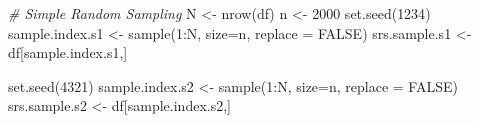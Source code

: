 \documentclass[11pt,]{article}
\newenvironment{Shaded}{\begin{snugshade}}{\end{snugshade}}
\newcommand{\AttributeTok}[1]{\textcolor[rgb]{0.77,0.63,0.00}{#1}}
\newcommand{\CommentTok}[1]{\textcolor[rgb]{0.56,0.35,0.01}{\textit{#1}}}
\newcommand{\ConstantTok}[1]{\textcolor[rgb]{0.00,0.00,0.00}{#1}}
\newcommand{\DecValTok}[1]{\textcolor[rgb]{0.00,0.00,0.81}{#1}}
\newcommand{\FunctionTok}[1]{\textcolor[rgb]{0.00,0.00,0.00}{#1}}
\newcommand{\NormalTok}[1]{#1}
\newcommand{\OtherTok}[1]{\textcolor[rgb]{0.56,0.35,0.01}{#1}}
\newcommand{\SpecialCharTok}[1]{\textcolor[rgb]{0.00,0.00,0.00}{#1}}
\begin{document}
\begin{Shaded}
\begin{Highlighting}[]
\CommentTok{\# Simple Random Sampling}
\NormalTok{N }\OtherTok{\textless{}{-}} \FunctionTok{nrow}\NormalTok{(df)}
\NormalTok{n }\OtherTok{\textless{}{-}} \DecValTok{2000}
\FunctionTok{set.seed}\NormalTok{(}\DecValTok{1234}\NormalTok{)}
\NormalTok{sample.index.s1 }\OtherTok{\textless{}{-}} \FunctionTok{sample}\NormalTok{(}\DecValTok{1}\SpecialCharTok{:}\NormalTok{N, }\AttributeTok{size=}\NormalTok{n, }\AttributeTok{replace =} \ConstantTok{FALSE}\NormalTok{)}
\NormalTok{srs.sample.s1 }\OtherTok{\textless{}{-}}\NormalTok{ df[sample.index.s1,]}

\FunctionTok{set.seed}\NormalTok{(}\DecValTok{4321}\NormalTok{)}
\NormalTok{sample.index.s2 }\OtherTok{\textless{}{-}} \FunctionTok{sample}\NormalTok{(}\DecValTok{1}\SpecialCharTok{:}\NormalTok{N, }\AttributeTok{size=}\NormalTok{n, }\AttributeTok{replace =} \ConstantTok{FALSE}\NormalTok{)}
\NormalTok{srs.sample.s2 }\OtherTok{\textless{}{-}}\NormalTok{ df[sample.index.s2,]}
\end{Highlighting}
\end{Shaded}
\end{document}
